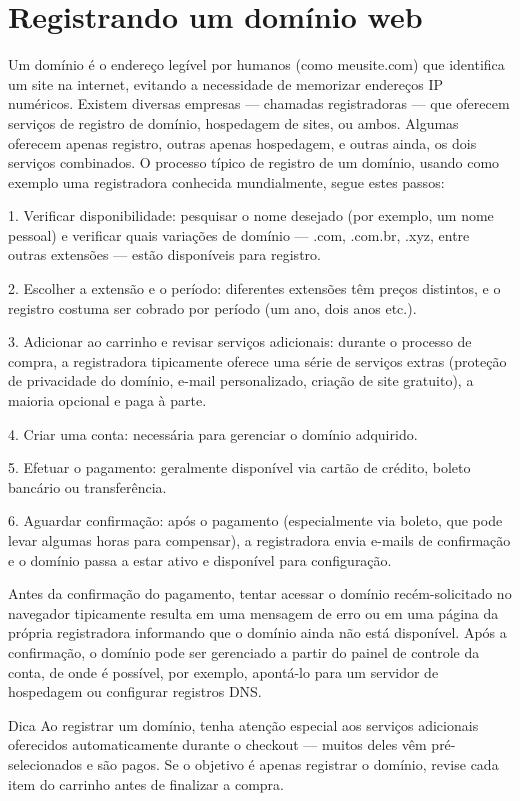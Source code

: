 \section{Registrando um domínio web}

Um domínio é o endereço legível por humanos (como meusite.com) que identifica um site na internet, evitando a necessidade de memorizar endereços IP numéricos. Existem diversas empresas — chamadas registradoras — que oferecem serviços de registro de domínio, hospedagem de sites, ou ambos. Algumas oferecem apenas registro, outras apenas hospedagem, e outras ainda, os dois serviços combinados. O processo típico de registro de um domínio, usando como exemplo uma registradora conhecida mundialmente, segue estes passos:

1. Verificar disponibilidade: pesquisar o nome desejado (por exemplo, um nome pessoal) e verificar quais variações de domínio — .com, .com.br, .xyz, entre outras extensões — estão disponíveis para registro.

2. Escolher a extensão e o período: diferentes extensões têm preços distintos, e o registro costuma ser cobrado por período (um ano, dois anos etc.).

3. Adicionar ao carrinho e revisar serviços adicionais: durante o processo de compra, a registradora tipicamente oferece uma série de serviços extras (proteção de privacidade do domínio, e-mail personalizado, criação de site gratuito), a maioria opcional e paga à parte.

4. Criar uma conta: necessária para gerenciar o domínio adquirido.

5. Efetuar o pagamento: geralmente disponível via cartão de crédito, boleto bancário ou transferência.

6. Aguardar confirmação: após o pagamento (especialmente via boleto, que pode levar algumas horas para compensar), a registradora envia e-mails de confirmação e o domínio passa a estar ativo e disponível para configuração.

Antes da confirmação do pagamento, tentar acessar o domínio recém-solicitado no navegador tipicamente resulta em uma mensagem de erro ou em uma página da própria registradora informando que o domínio ainda não está disponível. Após a confirmação, o domínio pode ser gerenciado a partir do painel de controle da conta, de onde é possível, por exemplo, apontá-lo para um servidor de hospedagem ou configurar registros DNS.

\begin{infobox}{Dica}
Ao registrar um domínio, tenha atenção especial aos serviços adicionais oferecidos automaticamente durante o checkout — muitos deles vêm pré-selecionados e são pagos. Se o objetivo é apenas registrar o domínio, revise cada item do carrinho antes de finalizar a compra.
\end{infobox}

